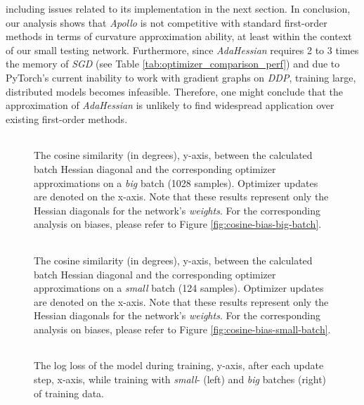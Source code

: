 including issues related to its implementation in the next section.
In conclusion, our analysis shows that \emph{Apollo} is not competitive with standard first-order methods in terms of curvature approximation ability,
at least within the context of our small testing network.
Furthermore, since \emph{AdaHessian} requires 2 to 3 times the memory of \emph{SGD} (see Table \ref{tab:optimizer_comparison_perf})
and due to PyTorch's current inability to work with gradient graphs on \emph{DDP}, training large, distributed models becomes infeasible.
Therefore, one might conclude that the approximation of \emph{AdaHessian} is unlikely to find widespread application over existing first-order methods.
\begin{figure}[h!]
    \centering
    \begin{tabular}{cc}
         \\ %
    \end{tabular}
    \caption{The cosine similarity (in degrees), y-axis, between the calculated batch Hessian diagonal and the corresponding optimizer approximations on a \emph{big} batch (1028 samples).
    Optimizer updates are denoted on the x-axis.
    Note that these results represent only the Hessian diagonals for the network's \emph{weights}. For the corresponding analysis on biases, please refer to Figure \ref{fig:cosine-bias-big-batch}.}
    \label{fig:cosine-big-batch}
\end{figure}


\begin{figure}[h!]
    \centering
    \begin{tabular}{cc}
         \\ %
    \end{tabular}
    \caption{The cosine similarity (in degrees), y-axis, between the calculated batch Hessian diagonal and the corresponding optimizer approximations on a \emph{small} batch (124 samples).
    Optimizer updates are denoted on the x-axis.
    Note that these results represent only the Hessian diagonals for the network's \emph{weights}. For the corresponding analysis on biases, please refer to Figure \ref{fig:cosine-bias-small-batch}.
}
    \label{fig:cosine-small-batch}
\end{figure}

\begin{figure}[h!]
    \centering
    \begin{tabular}{cc}
         \\ %
    \end{tabular}
    \caption{The log loss of the model during training, y-axis, after each update step, x-axis, while training with  \emph{small}- (left) and \emph{big} batches (right) of training data.}
    \label{fig:loss-big-batch}
\end{figure}

